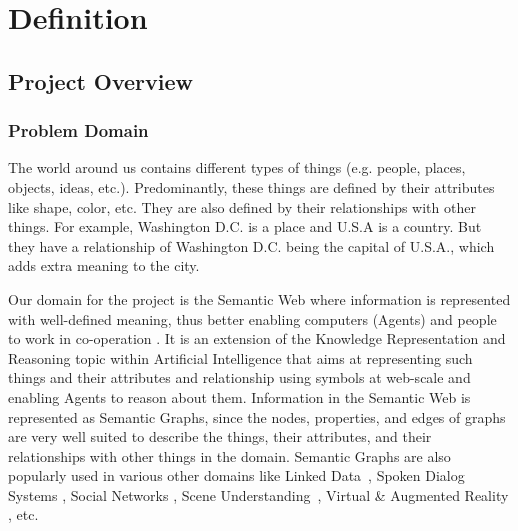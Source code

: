 \documentclass[runningheads,a4paper]{IEEEtran}
\begin{document}
\section{Definition}
\subsection{Project Overview}

\subsubsection{Problem Domain}

The world around us contains different types of things (e.g. people, places,
objects, ideas, etc.). Predominantly, these things are defined by their attributes
like shape, color, etc. They are also defined by their relationships with 
other things. For example, Washington D.C. is a
place and U.S.A is a country. But they have a relationship of Washington D.C.
being the capital of U.S.A., which adds extra meaning to the city. 

Our domain for the project is the Semantic Web where information is represented with well-defined meaning, thus better enabling computers (Agents) and people to work in co-operation \cite{berners2001semantic}. It is an extension of the Knowledge Representation and Reasoning topic within Artificial Intelligence that aims at representing such things and their attributes and relationship using symbols at web-scale and enabling Agents to reason about them. 
Information in the Semantic Web is represented as Semantic Graphs, since the nodes, properties, and edges of graphs are very well suited to describe the things, their attributes,
and their relationships with other things in the domain. Semantic Graphs are also popularly used in various other domains like Linked Data~\cite{heath2011linked}, Spoken Dialog Systems \cite{socher2011parsing}, Social Networks \cite{backstrom2011supervised}, Scene Understanding~\cite{socher2011parsing}, Virtual \& Augmented Reality \cite{lugrin2007making}, etc. 
\end{document}
